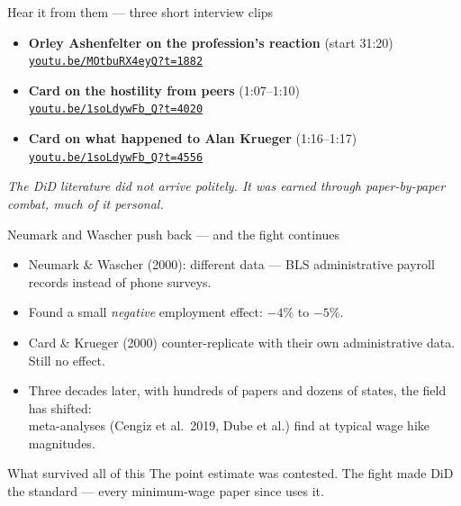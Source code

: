 \documentclass[aspectratio=169,11pt]{beamer}
\begin{document}
\begin{frame}{Hear it from them --- three short interview clips}
\vspace{0.5em}
\begin{itemize}
  \item \textbf{Orley Ashenfelter on the profession's reaction} (start 31:20) \\
        \href{https://youtu.be/MOtbuRX4eyQ?t=1882}{\color{ocean}\texttt{youtu.be/MOtbuRX4eyQ?t=1882}}
  \vspace{0.3em}
  \item \textbf{Card on the hostility from peers} (1:07--1:10) \\
        \href{https://youtu.be/1soLdywFb_Q?si=laAVYf_E2KBZKywG&t=4020}{\color{ocean}\texttt{youtu.be/1soLdywFb\_Q?t=4020}}
  \vspace{0.3em}
  \item \textbf{Card on what happened to Alan Krueger} (1:16--1:17) \\
        \href{https://youtu.be/1soLdywFb_Q?si=jsb8h50ZosGDnKrv&t=4556}{\color{ocean}\texttt{youtu.be/1soLdywFb\_Q?t=4556}}
\end{itemize}
\vspace{0.6em}
\begin{center}
\small\color{warmgray}\itshape
The DiD literature did not arrive politely. \;It was earned through paper-by-paper combat, much of it personal.
\end{center}
\end{frame}

\begin{frame}{Neumark and Wascher push back --- and the fight continues}
\vspace{0.4em}
\begin{itemize}
  \item Neumark \& Wascher (2000): different data --- BLS administrative payroll records instead of phone surveys.
  \item Found a small \textit{negative} employment effect: $-4\%$ to $-5\%$.
  \item Card \& Krueger (2000) counter-replicate with their own administrative data. \;Still no effect.
  \item Three decades later, with hundreds of papers and dozens of states, the field has shifted: \\
        meta-analyses (Cengiz et al.\ 2019, Dube et al.) find  at typical wage hike magnitudes.
\end{itemize}
\vspace{0.5em}
\begin{block}{What survived all of this}
\small
The point estimate was contested. \; \;The fight made DiD the standard --- every minimum-wage paper since uses it.
\end{block}
\end{frame}
\end{document}
